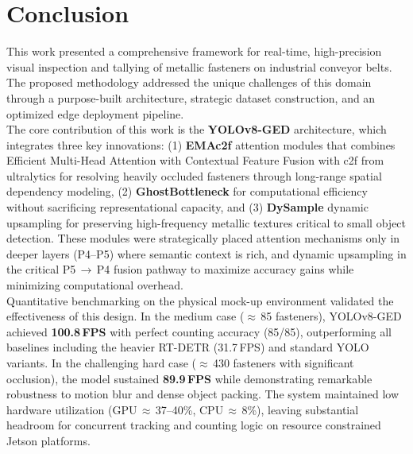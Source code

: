 

\label{chap:conclusion}

\section{Conclusion}

This work presented a comprehensive framework for real-time, high-precision visual inspection and tallying of metallic fasteners on industrial conveyor belts. The proposed methodology addressed the unique challenges of this domain through a purpose-built architecture, strategic dataset construction, and an optimized edge deployment pipeline.\\

The core contribution of this work is the \textbf{YOLOv8-GED} architecture, which integrates three key innovations: (1) \textbf{EMAc2f} attention modules that combines \cite{Ouyang_2023} Efficient Multi-Head Attention with Contextual Feature Fusion with c2f from ultralytics for resolving heavily occluded fasteners through long-range spatial dependency modeling, (2) \cite{10537737} \textbf{GhostBottleneck} for computational efficiency without sacrificing representational capacity, and (3) \cite{zhao2025dyglnethybridgloballocalfeature} \textbf{DySample} dynamic upsampling for preserving high-frequency metallic textures critical to small object detection. These modules were strategically placed attention mechanisms only in deeper layers (P4--P5) where semantic context is rich, and dynamic upsampling in the critical P5\,$\rightarrow$\,P4 fusion pathway to maximize accuracy gains while minimizing computational overhead.\\

Quantitative benchmarking on the physical mock-up environment validated the effectiveness of this design. In the medium case ($\approx$\,85 fasteners), YOLOv8-GED achieved \textbf{100.8\,FPS} with perfect counting accuracy (85/85), outperforming all baselines including the heavier RT-DETR (31.7\,FPS) and standard YOLO variants. In the challenging hard case ($\approx$\,430 fasteners with significant occlusion), the model sustained \textbf{89.9\,FPS} while demonstrating remarkable robustness to motion blur and dense object packing. The system maintained low hardware utilization (GPU\,$\approx$\,37--40\%, CPU\,$\approx$\,8\%), leaving substantial headroom for concurrent tracking and counting logic on resource constrained Jetson platforms.\\

